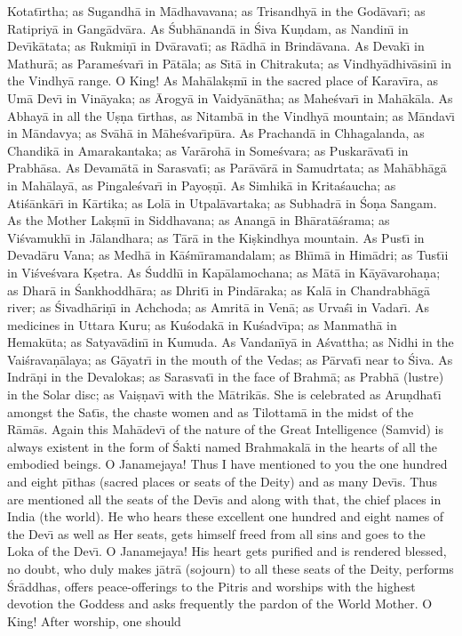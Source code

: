 Kotat\={\i}rtha; as Sugandh\=a in M\=adhavavana; as Trisandhy\=a in the God\=avar\={\i}; as Ratipriy\=a in Gang\=adv\=ara. As \'Subh\=anand\=a in \'Siva Ku\d{n}dam, as Nandin\={\i} in Dev\={\i}k\=atata; as Rukmi\d{n}\={\i} in Dv\=aravat\={\i}; as R\=adh\=a in Brind\=avana. As Devak\={\i} in Mathur\=a; as Parame\'svar\={\i} in P\=at\=ala; as S\={\i}t\=a in Chitrakuta; as Vindhy\=adhiv\=asin\={\i} in the Vindhy\=a range. O King! As Mah\=alak\d{s}m\={\i} in the sacred place of Karav\={\i}ra, as Um\=a Dev\={\i} in Vin\=ayaka; as \=Arogy\=a in Vaidy\=an\=atha; as Mahe\'svar\={\i} in Mah\=ak\=ala. As Abhay\=a in all the U\d{s}\d{n}a t\={\i}rthas, as Nitamb\=a in the Vindhy\=a mountain; as M\=andav\={\i} in M\=andavya; as Sv\=ah\=a in M\=ahe\'svar\={\i}p\=ura. As Prachand\=a in Chhagalanda, as Chandik\=a in Amarakantaka; as Var\=aroh\=a in Some\'svara; as Puskar\=avat\={\i} in Prabh\=asa. As Devam\=at\=a in Sarasvat\={\i}; as Par\=av\=ar\=a in Samudrtata; as Mah\=abh\=ag\=a in Mah\=alay\=a, as Pingale\'svar\={\i} in Payo\d{s}\d{n}\={\i}. As Simhik\=a in Krita\'saucha; as Ati\'s\=ank\=ar\={\i} in K\=artika; as Lol\=a in Utpal\=avartaka; as Subhadr\=a in \'So\d{n}a Sangam. As the Mother Lak\d{s}m\={\i} in Siddhavana; as Anang\=a in Bh\=arat\=a\'srama; as Vi\'svamukh\={\i} in J\=alandhara; as T\=ar\=a in the Ki\d{s}kindhya mountain. As Pust\={\i} in Devad\=aru Vana; as Medh\=a in K\=a\'sm\={\i}ramandalam; as Bh\={\i}m\=a in Him\=adri; as Tust\={\i}i in Vi\'sve\'svara K\d{s}etra. As \'Suddh\={\i} in Kap\=alamochana; as M\=at\=a in K\=ay\=avaroha\d{n}a; as Dhar\=a in \'Sankhoddh\=ara; as Dhrit\={\i} in Pind\=araka; as Kal\=a in Chandrabh\=ag\=a river; as \'Sivadh\=ari\d{n}\={\i} in Achchoda; as Amrit\=a in Ven\=a; as Urva\'s\={\i} in Vadar\={\i}. As medicines in Uttara Kuru; as Ku\'sodak\=a in Ku\'sadv\={\i}pa; as Manmath\=a in Hemak\=uta; as Satyav\=adin\={\i} in Kumuda. As Vandan\={\i}y\=a in A\'svattha; as Nidhi in the Vai\'srava\d{n}\=alaya; as G\=ayatr\={\i} in the mouth of the Vedas; as P\=arvat\={\i} near to \'Siva. As Indr\=a\d{n}i in the Devalokas; as Sarasvat\={\i} in the face of Brahm\=a; as Prabh\=a (lustre) in the Solar disc; as Vai\d{s}\d{n}av\={\i} with the M\=atrik\=as. She is celebrated as Aru\d{n}dhat\={\i} amongst the Sat\={\i}s, the chaste women and as Tilottam\=a in the midst of the R\=am\=as. Again this Mah\=adev\={\i} of the nature of the Great Intelligence (Samvid) is always existent in the form of \'Sakti named Brahmakal\=a in the hearts of all the embodied beings. O Janamejaya! Thus I have mentioned to you the one hundred and eight p\={\i}thas (sacred places or seats of the Deity) and as many Dev\={\i}s. Thus are mentioned all the seats of the Dev\={\i}s and along with that, the chief places in India (the world). He who hears these excellent one hundred and eight names of the Dev\={\i} as well as Her seats, gets himself freed from all sins and goes to the Loka of the Dev\={\i}. O Janamejaya! His heart gets purified and is rendered blessed, no doubt, who duly makes j\=atr\=a (sojourn) to all these seats of the Deity, performs \'Sr\=addhas, offers peace-offerings to the Pitris and worships with the highest devotion the Goddess and asks frequently the pardon of the World Mother. O King! After worship, one should

